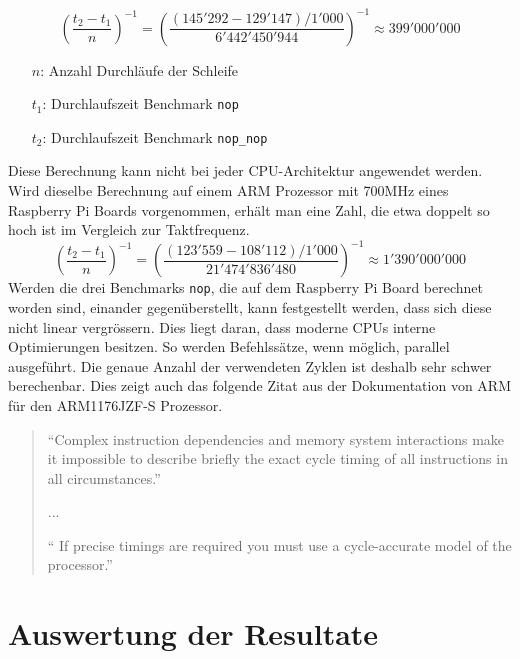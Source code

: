 \begin{minipage}{\textwidth}
\[ \left(\frac{t_2-t_1}{n}\right)^{-1} =  \left(\frac{(145'292-129'147)/1'000}{6'442'450'944}\right)^{-1} \approx 399'000'000 \]
\hspace{1em}
\begin{itemize}
\itemsep1pt
    \item[$n$:] Anzahl Durchläufe der Schleife
    \item[$t_1$:] Durchlaufszeit Benchmark \texttt{nop}
    \item[$t_2$:] Durchlaufszeit Benchmark \texttt{nop\_nop}
\end{itemize}
\end{minipage}


Diese Berechnung kann nicht bei jeder CPU-Architektur angewendet werden. Wird dieselbe Berechnung auf einem ARM Prozessor mit 700MHz eines Raspberry Pi Boards vorgenommen, erhält man eine Zahl, die etwa doppelt so hoch ist im Vergleich zur Taktfrequenz.
\[ \left(\frac{t_2-t_1}{n}\right)^{-1} =  \left(\frac{(123'559-108'112)/1'000}{21'474'836'480}\right)^{-1} \approx 1'390'000'000 \]
Werden die drei Benchmarks \texttt{nop}, die auf dem Raspberry Pi Board berechnet worden sind, einander gegenüberstellt, kann festgestellt werden, dass sich diese nicht linear vergrössern. Dies liegt daran, dass moderne CPUs interne Optimierungen besitzen. So werden Befehlssätze, wenn möglich, parallel ausgeführt. Die genaue Anzahl der verwendeten Zyklen ist deshalb sehr schwer berechenbar. Dies zeigt auch das folgende Zitat aus der Dokumentation von ARM für den ARM1176JZF-S Prozessor.

\begin{quotation}
\enquote{Complex instruction dependencies and memory system interactions make it impossible to
describe briefly the exact cycle timing of all instructions in all circumstances.}
\par
...
\par
\enquote{ If precise timings are required you must use a cycle-accurate model of the processor.\cite{arm_datasheet}}
\end{quotation}



\section{Auswertung der Resultate}
\label{sec:auswertung_resultate}

